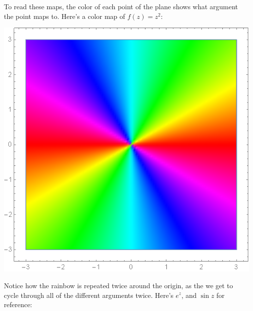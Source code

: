 \documentclass[12pt]{scrartcl}
\begin{document}
To read these maps, the color of each point of the plane shows what argument the point maps to. Here's a color map of $f(z) = z^2$:
\begin{center}
	\includegraphics[scale=0.27]{images/colorzsqr.png}
\end{center}
Notice how the rainbow is repeated twice around the origin, as the we get to cycle through all of the different arguments twice. Here's $e^z$, and $\sin z$ for reference:
\end{document}
